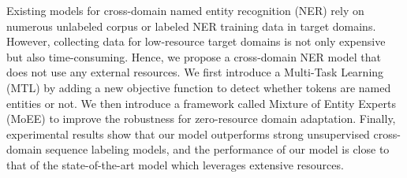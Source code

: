 Existing models for cross-domain named entity recognition (NER) rely on numerous unlabeled corpus or labeled NER training data in target domains. However, collecting data for low-resource target domains is not only expensive but also time-consuming. Hence, we propose a cross-domain NER model that does not use any external resources. We first introduce a Multi-Task Learning (MTL) by adding a new objective function to detect whether tokens are named entities or not. We then introduce a framework called Mixture of Entity Experts (MoEE) to improve the robustness for zero-resource domain adaptation. Finally, experimental results show that our model outperforms strong unsupervised cross-domain sequence labeling models, and the performance of our model is close to that of the state-of-the-art model which leverages extensive resources.
